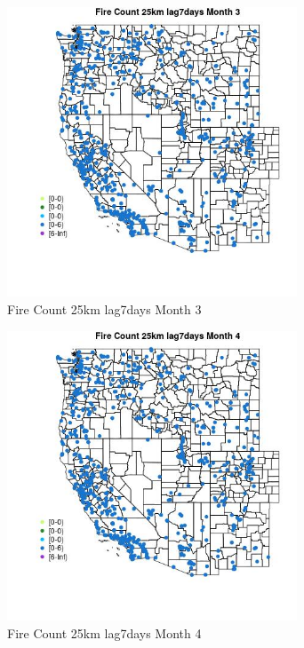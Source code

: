 \begin{figure} 
\centering  
\includegraphics[width=0.77\textwidth]{Code_Outputs/Report_ML_input_PM25_Step4_part_e_de_duplicated_aves_compiled_2019-05-21wNAs_MapObsMo3Fire_Count_25km_lag7days.jpg} 
\caption{\label{fig:Report_ML_input_PM25_Step4_part_e_de_duplicated_aves_compiled_2019-05-21wNAsMapObsMo3Fire_Count_25km_lag7days}Fire Count 25km lag7days Month 3} 
\end{figure} 
 

\begin{figure} 
\centering  
\includegraphics[width=0.77\textwidth]{Code_Outputs/Report_ML_input_PM25_Step4_part_e_de_duplicated_aves_compiled_2019-05-21wNAs_MapObsMo4Fire_Count_25km_lag7days.jpg} 
\caption{\label{fig:Report_ML_input_PM25_Step4_part_e_de_duplicated_aves_compiled_2019-05-21wNAsMapObsMo4Fire_Count_25km_lag7days}Fire Count 25km lag7days Month 4} 
\end{figure} 
 

